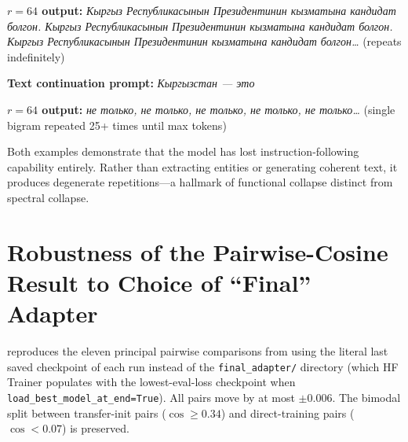 \documentclass[11pt]{article}
\begin{document}
\textbf{$r{=}64$ output:} {\cyrfont\textit{Кыргыз Республикасынын Президентинин кызматына кандидат болгон. Кыргыз Республикасынын Президентинин кызматына кандидат болгон. Кыргыз Республикасынын Президентинин кызматына кандидат болгон\ldots}} (repeats indefinitely)

\textbf{Text continuation prompt:} {\cyrfont\textit{Кыргызстан --- это}}

\textbf{$r{=}64$ output:} {\cyrfont\textit{не только, не только, не только, не только, не только\ldots}} (single bigram repeated 25+ times until max tokens)

Both examples demonstrate that the model has lost instruction-following capability entirely. Rather than extracting entities or generating coherent text, it produces degenerate repetitions---a hallmark of functional collapse distinct from spectral collapse.

\section{Robustness of the Pairwise-Cosine Result to Choice of ``Final'' Adapter}
\label{app:lastckpt_robustness}

 reproduces the eleven principal pairwise comparisons from  using the literal last saved checkpoint of each run instead of the \texttt{final\_adapter/} directory (which HF Trainer populates with the lowest-eval-loss checkpoint when \texttt{load\_best\_model\_at\_end=True}). All pairs move by at most $\pm 0.006$. The bimodal split between transfer-init pairs ($\cos \geq 0.34$) and direct-training pairs ($\cos < 0.07$) is preserved.
\end{document}
